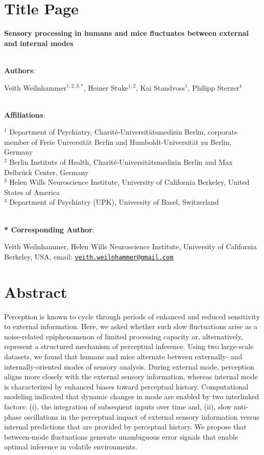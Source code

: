 \documentclass[
]{article}
\author{}
\date{\vspace{-2.5em}}
\begin{document}
\hypertarget{title-page}{%
\section{Title Page}\label{title-page}}

\textbf{Sensory processing in humans and mice fluctuates between
external and internal modes}\\
\strut \\

\textbf{Authors}:

Veith Weilnhammer\(^{1,2, 3, *}\), Heiner Stuke\(^{1,2}\), Kai
Standvoss\(^{1}\), Philipp Sterzer\(^{4}\)\\
\strut \\
\textbf{Affiliations}:

\(^{1}\) Department of Psychiatry, Charité-Universitätsmedizin Berlin,
corporate member of Freie Universität Berlin and Humboldt-Universität zu
Berlin, Germany\\
\(^{2}\) Berlin Institute of Health, Charité-Universitätsmedizin Berlin
and Max Delbrück Center, Germany\\
\(^{3}\) Helen Wills Neuroscience Institute, University of California
Berkeley, United States of America\\
\(^{4}\) Department of Psychiatry (UPK), University of Basel,
Switzerland\\
\strut \\

\textbf{* Corresponding Author}:

Veith Weilnhammer, Helen Wills Neuroscience Institute, University of
California Berkeley, USA, email:
\href{mailto:veith.weilnhammer@gmail.com}{\nolinkurl{veith.weilnhammer@gmail.com}}\\

\newpage

\hypertarget{abstract}{%
\section{Abstract}\label{abstract}}

Perception is known to cycle through periods of enhanced and reduced
sensitivity to external information. Here, we asked whether such slow
fluctuations arise as a noise-related epiphenomenon of limited
processing capacity or, alternatively, represent a structured mechanism
of perceptual inference. Using two large-scale datasets, we found that
humans and mice alternate between externally- and internally-oriented
modes of sensory analysis. During external mode, perception aligns more
closely with the external sensory information, whereas internal mode is
characterized by enhanced biases toward perceptual history.
Computational modeling indicated that dynamic changes in mode are
enabled by two interlinked factors: (i), the integration of subsequent
inputs over time and, (ii), slow anti-phase oscillations in the
perceptual impact of external sensory information versus internal
predictions that are provided by perceptual history. We propose that
between-mode fluctuations generate unambiguous error signals that enable
optimal inference in volatile environments.
\end{document}
